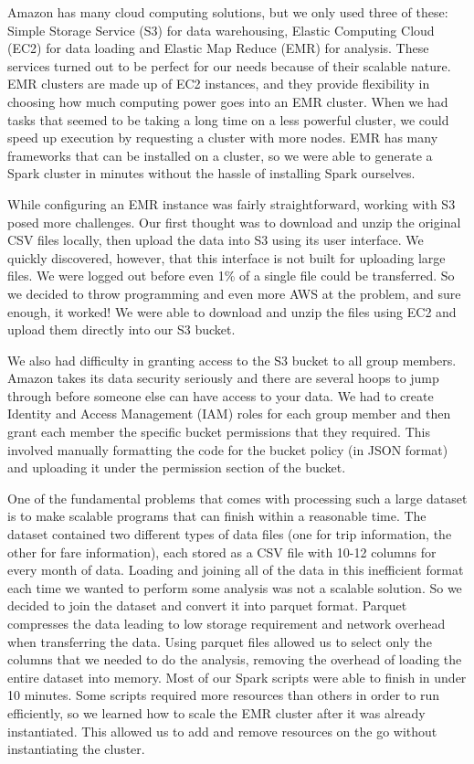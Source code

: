 \documentclass[11pt]{article} %
\begin{document}
Amazon has many cloud computing solutions, but we only used three of these: Simple Storage Service (S3) for data warehousing, Elastic Computing Cloud (EC2) for data loading and Elastic Map Reduce (EMR) for analysis. These services turned out to be perfect for our needs because of their scalable nature. EMR clusters are made up of EC2 instances, and they provide flexibility in choosing how much computing power goes into an EMR cluster. When we had tasks that seemed to be taking a long time on a less powerful cluster, we could speed up execution by requesting a cluster with more nodes. EMR has many frameworks that can be installed on a cluster, so we were able to generate a Spark cluster in minutes without the hassle of installing Spark ourselves.

While configuring an EMR instance was fairly straightforward, working with S3 posed more challenges. Our first thought was to download and unzip the original CSV files locally, then upload the data into S3 using its user interface. We quickly discovered, however, that this interface is not built for uploading large files. We were logged out before even 1\% of a single file could be transferred. So we decided to throw programming and even more AWS at the problem, and sure enough, it worked! We were able to download and unzip the files using EC2 and upload them directly into our S3 bucket.

We also had difficulty in granting access to the S3 bucket to all group members. Amazon takes its data security seriously and there are several hoops to jump through before someone else can have access to your data. We had to create Identity and Access Management (IAM) roles for each group member and then grant each member the specific bucket permissions that they required. This involved manually formatting the code for the bucket policy (in JSON format) and uploading it under the permission section of the bucket.

One of the fundamental problems that comes with processing such a large dataset is to make scalable programs that can finish within a reasonable time. The dataset contained two different types of data files (one for trip information, the other for fare information), each stored as a CSV file with 10-12 columns for every month of data. Loading and joining all of the data in this inefficient format each time we wanted to perform some analysis was not a scalable solution. So we decided to join the dataset and convert it into parquet format. Parquet compresses the data leading to low storage requirement and network overhead when transferring the data. Using parquet files allowed us to select only the columns that we needed to do the analysis, removing the overhead of loading the entire dataset into memory. Most of our Spark scripts were able to finish in under 10 minutes. Some scripts required more resources than others in order to run efficiently, so we learned how to scale the EMR cluster after it was already instantiated. This allowed us to add and remove resources on the go without instantiating the cluster.
\end{document}
